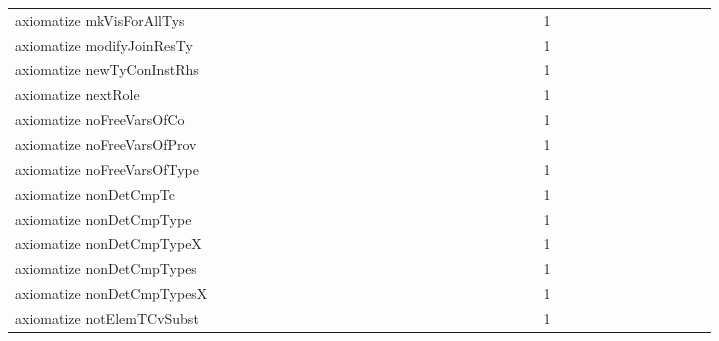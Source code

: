 {\begin{tabular}{l|rrr|rrr|rrr}
axiomatize mkVisForAllTys &  &  &  &  &  &  &  &  &  &  &  &  &  &  &  &  &  &  &  &  &  &  &  & 1 &  &  &  &  &  &  &  &  &  &  &  & \\
axiomatize modifyJoinResTy &  &  &  &  &  &  &  &  &  &  &  &  &  &  &  &  &  &  &  &  &  &  &  & 1 &  &  &  &  &  &  &  &  &  &  &  & \\
axiomatize newTyConInstRhs &  &  &  &  &  &  &  &  &  &  &  &  &  &  &  &  &  &  &  &  &  &  &  & 1 &  &  &  &  &  &  &  &  &  &  &  & \\
axiomatize nextRole &  &  &  &  &  &  &  &  &  &  &  &  &  &  &  &  &  &  &  &  &  &  &  & 1 &  &  &  &  &  &  &  &  &  &  &  & \\
axiomatize noFreeVarsOfCo &  &  &  &  &  &  &  &  &  &  &  &  &  &  &  &  &  &  &  &  &  &  &  & 1 &  &  &  &  &  &  &  &  &  &  &  & \\
axiomatize noFreeVarsOfProv &  &  &  &  &  &  &  &  &  &  &  &  &  &  &  &  &  &  &  &  &  &  &  & 1 &  &  &  &  &  &  &  &  &  &  &  & \\
axiomatize noFreeVarsOfType &  &  &  &  &  &  &  &  &  &  &  &  &  &  &  &  &  &  &  &  &  &  &  & 1 &  &  &  &  &  &  &  &  &  &  &  & \\
axiomatize nonDetCmpTc &  &  &  &  &  &  &  &  &  &  &  &  &  &  &  &  &  &  &  &  &  &  &  & 1 &  &  &  &  &  &  &  &  &  &  &  & \\
axiomatize nonDetCmpType &  &  &  &  &  &  &  &  &  &  &  &  &  &  &  &  &  &  &  &  &  &  &  & 1 &  &  &  &  &  &  &  &  &  &  &  & \\
axiomatize nonDetCmpTypeX &  &  &  &  &  &  &  &  &  &  &  &  &  &  &  &  &  &  &  &  &  &  &  & 1 &  &  &  &  &  &  &  &  &  &  &  & \\
axiomatize nonDetCmpTypes &  &  &  &  &  &  &  &  &  &  &  &  &  &  &  &  &  &  &  &  &  &  &  & 1 &  &  &  &  &  &  &  &  &  &  &  & \\
axiomatize nonDetCmpTypesX &  &  &  &  &  &  &  &  &  &  &  &  &  &  &  &  &  &  &  &  &  &  &  & 1 &  &  &  &  &  &  &  &  &  &  &  & \\
axiomatize notElemTCvSubst &  &  &  &  &  &  &  &  &  &  &  &  &  &  &  &  &  &  &  &  &  &  &  & 1 &  &  &  &  &  &  &  &  &  &  &  & \\

\end{tabular}}
